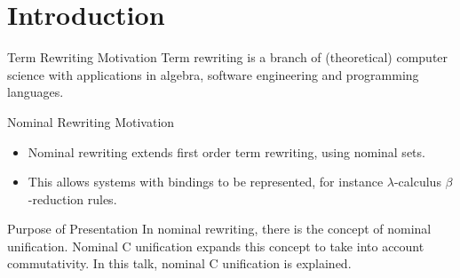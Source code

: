 \section{Introduction}

\begin{frame}{Term Rewriting Motivation}
    Term rewriting is a branch of (theoretical) computer science with applications in 
    algebra, software engineering and programming languages. 
\end{frame}

\begin{frame}{Nominal Rewriting Motivation}
\begin{itemize} 
    \item Nominal rewriting extends first order term rewriting, using nominal sets.
    \item This allows systems with bindings to be represented, for instance 
        $\lambda$-calculus $\beta$-reduction rules. 
\end{itemize}
\end{frame}


\begin{frame}{Purpose of Presentation}
    In nominal rewriting, there is the concept of nominal unification. Nominal C
    unification expands this concept to 
    take into account commutativity. In this talk, nominal C unification is explained.  
\end{frame}


